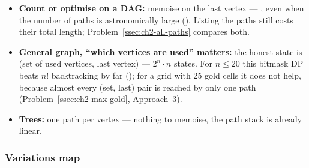 \begin{itemize}[leftmargin=*]
    \item \textbf{Count or optimise on a DAG:} memoise on the last vertex --- \VE{}, even when the number of paths is astronomically large (). Listing the paths still costs their total length; Problem~\ref{ssec:ch2-all-paths} compares both.
    \item \textbf{General graph, ``which vertices are used'' matters:} the honest state is (set of used vertices, last vertex) --- $2^n \cdot n$ states. For $n \le 20$ this bitmask DP beats $n!$ backtracking by far (); for a grid with 25 gold cells it does not help, because almost every (set, last) pair is reached by only one path (Problem~\ref{ssec:ch2-max-gold}, Approach~3).
    \item \textbf{Trees:} one path per vertex --- nothing to memoise, the path stack is already linear.
\end{itemize}

\subsubsection*{Variations map}

